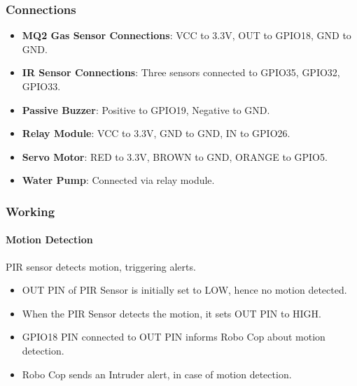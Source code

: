 \documentclass[conference]{IEEEtran}
\begin{document}
\subsubsection{\textbf{Connections}}
\begin{itemize}
    \item \textbf{MQ2 Gas Sensor Connections}: VCC to 3.3V, OUT to GPIO18, GND to GND.
    \item \textbf{IR Sensor Connections}: Three sensors connected to GPIO35, GPIO32, GPIO33.
    \item \textbf{Passive Buzzer}: Positive to GPIO19, Negative to GND.
    \item \textbf{Relay Module}: VCC to 3.3V, GND to GND, IN to GPIO26.
    \item \textbf{Servo Motor}: RED to 3.3V, BROWN to GND, ORANGE to GPIO5.
    \item \textbf{Water Pump}: Connected via relay module.
\end{itemize}

\subsubsection{\textbf {Working}}
\paragraph{\textbf{Motion Detection}}
PIR sensor detects motion, triggering alerts.
\begin{itemize}
    \item {OUT PIN of PIR Sensor is initially set to LOW, hence no motion detected.}
    \item{When the PIR Sensor detects the motion, it sets OUT PIN to HIGH.}
    \item{GPIO18 PIN connected to OUT PIN informs Robo Cop about motion detection.}
    \item{Robo Cop sends an Intruder alert, in case of motion detection.}
\end{itemize}
\end{document}
